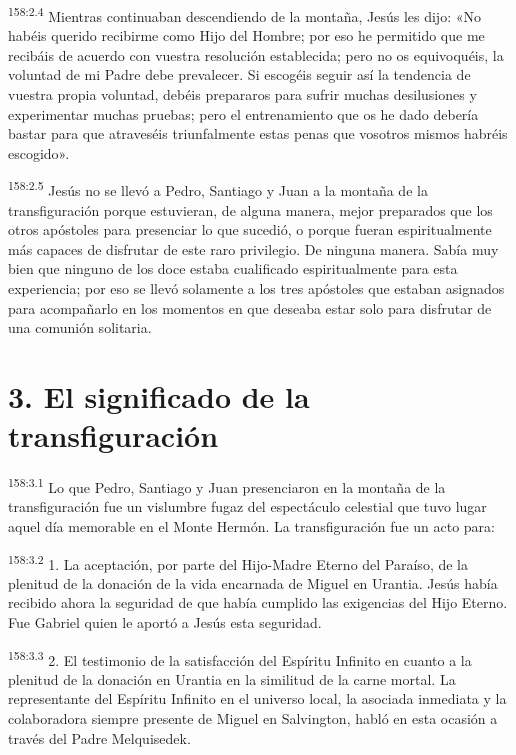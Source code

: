 \par
\textsuperscript{158:2.4} Mientras continuaban descendiendo de la montaña, Jesús les dijo: «No habéis querido recibirme como Hijo del Hombre; por eso he permitido que me recibáis de acuerdo con vuestra resolución establecida; pero no os equivoquéis, la voluntad de mi Padre debe prevalecer. Si escogéis seguir así la tendencia de vuestra propia voluntad, debéis prepararos para sufrir muchas desilusiones y experimentar muchas pruebas; pero el entrenamiento que os he dado debería bastar para que atraveséis triunfalmente estas penas que vosotros mismos habréis escogido».

\par
\textsuperscript{158:2.5} Jesús no se llevó a Pedro, Santiago y Juan a la montaña de la transfiguración porque estuvieran, de alguna manera, mejor preparados que los otros apóstoles para presenciar lo que sucedió, o porque fueran espiritualmente más capaces de disfrutar de este raro privilegio. De ninguna manera. Sabía muy bien que ninguno de los doce estaba cualificado espiritualmente para esta experiencia; por eso se llevó solamente a los tres apóstoles que estaban asignados para acompañarlo en los momentos en que deseaba estar solo para disfrutar de una comunión solitaria.

\section*{3. El significado de la transfiguración}
\par
\textsuperscript{158:3.1} Lo que Pedro, Santiago y Juan presenciaron en la montaña de la transfiguración fue un vislumbre fugaz del espectáculo celestial que tuvo lugar aquel día memorable en el Monte Hermón. La transfiguración fue un acto para:

\par
\textsuperscript{158:3.2} 1. La aceptación, por parte del Hijo-Madre Eterno del Paraíso, de la plenitud de la donación de la vida encarnada de Miguel en Urantia. Jesús había recibido ahora la seguridad de que había cumplido las exigencias del Hijo Eterno. Fue Gabriel quien le aportó a Jesús esta seguridad.

\par
\textsuperscript{158:3.3} 2. El testimonio de la satisfacción del Espíritu Infinito en cuanto a la plenitud de la donación en Urantia en la similitud de la carne mortal. La representante del Espíritu Infinito en el universo local, la asociada inmediata y la colaboradora siempre presente de Miguel en Salvington, habló en esta ocasión a través del Padre Melquisedek.

